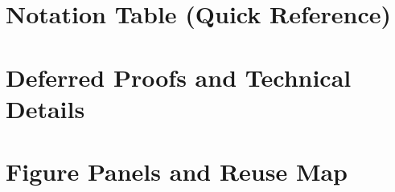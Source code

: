 \documentclass[12pt]{article}
\theoremstyle{plain}
\theoremstyle{definition}
\theoremstyle{remark}
\begin{document}


\appendix
\section{Notation Table (Quick Reference)}

\section{Deferred Proofs and Technical Details}

\section{Figure Panels and Reuse Map}
\end{document}
